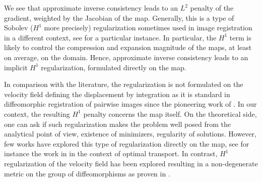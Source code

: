 
We see that approximate inverse consistency leads to an $L^2$ penalty of the gradient, weighted by the Jacobian of the map. Generally, this is a type of Sobolev ($H^1$ more precisely) regularization sometimes used in image registration in a different context, see \cite{template_matching} for a particular instance. In particular, the $H^1$ term is likely to control the compression and expansion magnitude of the maps, at least on average, on the domain.
Hence, approximate inverse consistency leads to an implicit $H^1$ regularization, formulated directly on the map. 
\par
In comparison with the literature, the regularization is not formulated on the velocity field defining the displacement by integration as it is standard in diffeomorphic registration of pairwise images since the pioneering work of \cite{DuGrMi1998}. In our context, the resulting $H^1$ penalty concerns the map itself. On the theoretical side, one can ask if such regularization makes the problem well posed from the analytical point of view, \ie existence of minimizers, regularity of solutions. However, few works have explored this type of regularization directly on the map, see for instance the work in \cite{DEPASCALE2016237} in the context of optimal transport. In contrast, $H^1$ regularization of the velocity field has been explored resulting in a non-degenerate metric on the group of diffeomorphisms as proven in \cite{Michor2005}.
